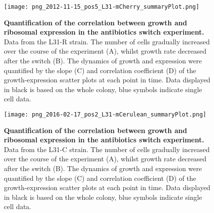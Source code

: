 \begin{figure}
    \begin{minipage}[c]{0.7\textwidth}
    \texttt{[image: png\_2012-11-15\_pos5\_L31-mCherry\_summaryPlot.png]}
    \end{minipage}\hfill
    \begin{minipage}[c]{0.3\textwidth}
    \caption{ 
        \textbf{Quantification of the correlation between growth and ribosomal expression in the antibiotics switch experiment.}
        Data from the L31-R strain. The number of cells gradually increased over the course of the experiment (A), whilst growth rate decreased after the switch (B).
        The dynamics of growth and expression were quantified by the slope (C) and correlation coefficient (D) of the growth-expression scatter plots at each point in time.
        Data displayed in black is based on the whole colony, blue symbols indicate single cell data.
    }
    \label{fig:ribo:switch1}
    \end{minipage}
\end{figure}

\begin{figure}
    \begin{minipage}[c]{0.7\textwidth}
        \texttt{[image: png\_2016-02-17\_pos2\_L31-mCerulean\_summaryPlot.png]}
    \end{minipage}\hfill
    \begin{minipage}[c]{0.3\textwidth}
        \caption{ 
            \textbf{Quantification of the correlation between growth and ribosomal expression in the antibiotics switch experiment.}
            Data from the L31-C strain. The number of cells gradually increased over the course of the experiment (A), whilst growth rate decreased after the switch (B).
            The dynamics of growth and expression were quantified by the slope (C) and correlation coefficient (D) of the growth-expression scatter plots at each point in time.
            Data displayed in black is based on the whole colony, blue symbols indicate single cell data.
        }
        \label{fig:ribo:switch2}
    \end{minipage}
\end{figure}

